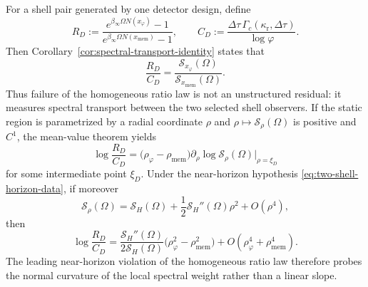 \begin{remark}\label{rem:spectral-transport-diagnostic}
For a shell pair generated by one detector design, define
\[
R_D
:=
\frac{e^{\beta_\infty\Omega N(x_\varphi)}-1}
     {e^{\beta_\infty\Omega N(x_{\mathrm{mem}})}-1},
\qquad
C_D
:=
\frac{\Delta\tau\,\Gamma_c(\kappa_{\mathrm r},\Delta\tau)}{\log\varphi}.
\]
Then Corollary~\ref{cor:spectral-transport-identity} states that
\[
\frac{R_D}{C_D}
=
\frac{\mathcal S_{x_\varphi}(\Omega)}{\mathcal S_{x_{\mathrm{mem}}}(\Omega)}.
\]
Thus failure of the homogeneous ratio law is not an unstructured residual: it measures spectral transport between the two selected shell observers. If the static region is parametrized by a radial coordinate $\rho$ and $\rho\mapsto \mathcal S_\rho(\Omega)$ is positive and $C^1$, the mean-value theorem yields
\begin{equation}\label{eq:spectral-gradient-identity}
\log\frac{R_D}{C_D}
=
\bigl(\rho_\varphi-\rho_{\mathrm{mem}}\bigr)
\partial_\rho\log\mathcal S_\rho(\Omega)\big|_{\rho=\xi_D}
\end{equation}
for some intermediate point $\xi_D$. Under the near-horizon hypothesis \eqref{eq:two-shell-horizon-data}, if moreover
\[
\mathcal S_\rho(\Omega)
=
\mathcal S_H(\Omega)+\frac12 \mathcal S_H''(\Omega)\rho^2+O(\rho^4),
\]
then
\begin{equation}\label{eq:spectral-curvature-identity}
\log\frac{R_D}{C_D}
=
\frac{\mathcal S_H''(\Omega)}{2\mathcal S_H(\Omega)}
\bigl(\rho_\varphi^2-\rho_{\mathrm{mem}}^2\bigr)
+O(\rho_\varphi^4+\rho_{\mathrm{mem}}^4).
\end{equation}
The leading near-horizon violation of the homogeneous ratio law therefore probes the normal curvature of the local spectral weight rather than a linear slope.
\end{remark}

